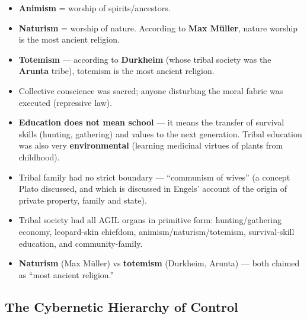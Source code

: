 \begin{DataFact}
\begin{itemize}
\item \textbf{Animism} = worship of spirits/ancestors.
\item \textbf{Naturism} = worship of nature. According to \textbf{Max Müller}, nature worship is the most ancient religion.
\item \textbf{Totemism} --- according to \textbf{Durkheim} (whose tribal society was the \textbf{Arunta} tribe), totemism is the most ancient religion.
\item Collective conscience was sacred; anyone disturbing the moral fabric was executed (repressive law).
\end{itemize}
\end{DataFact}

\begin{KeyConcept}
\begin{itemize}
\item \textbf{Education does not mean school} --- it means the transfer of survival skills (hunting, gathering) and values to the next generation. Tribal education was also very \textbf{environmental} (learning medicinal virtues of plants from childhood).
\item Tribal family had no strict boundary --- ``communism of wives'' (a concept Plato discussed, and which is discussed in Engels' account of the origin of private property, family and state).
\end{itemize}
\end{KeyConcept}

\begin{QuickRevision}
\begin{itemize}
\item Tribal society had all AGIL organs in primitive form: hunting/gathering economy, leopard-skin chiefdom, animism/naturism/totemism, survival-skill education, and community-family.
\item \textbf{Naturism} (Max Müller) vs \textbf{totemism} (Durkheim, Arunta) --- both claimed as ``most ancient religion.''
\end{itemize}
\end{QuickRevision}

\sectiondivider

\subsection{The Cybernetic Hierarchy of Control}

